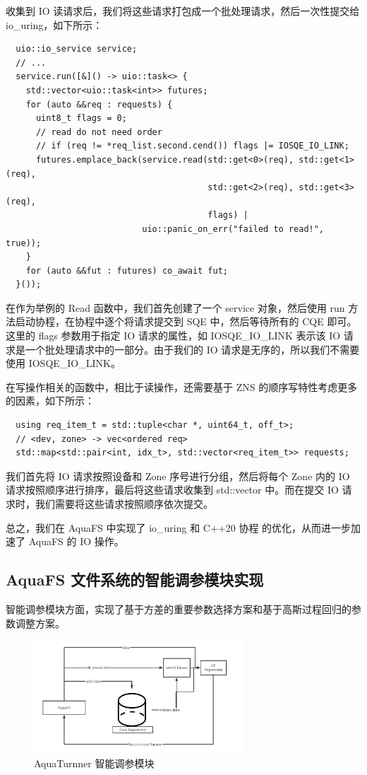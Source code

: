 收集到 IO 读请求后，我们将这些请求打包成一个批处理请求，然后一次性提交给 io\_uring，如下所示：

\begin{lstlisting}
  uio::io_service service;
  // ...
  service.run([&]() -> uio::task<> {
    std::vector<uio::task<int>> futures;
    for (auto &&req : requests) {
      uint8_t flags = 0;
      // read do not need order
      // if (req != *req_list.second.cend()) flags |= IOSQE_IO_LINK;
      futures.emplace_back(service.read(std::get<0>(req), std::get<1>(req),
                                        std::get<2>(req), std::get<3>(req),
                                        flags) |
                           uio::panic_on_err("failed to read!", true));
    }
    for (auto &&fut : futures) co_await fut;
  }());
\end{lstlisting}

在作为举例的 Read 函数中，我们首先创建了一个 service 对象，然后使用 run 方法启动协程，在协程中逐个将请求提交到 SQE 中，然后等待所有的 CQE 即可。这里的 flags 参数用于指定 IO 请求的属性，如 IOSQE\_IO\_LINK 表示该 IO 请求是一个批处理请求中的一部分。由于我们的 IO 请求是无序的，所以我们不需要使用 IOSQE\_IO\_LINK。

在写操作相关的函数中，相比于读操作，还需要基于 ZNS 的顺序写特性考虑更多的因素，如下所示：

\begin{lstlisting}
  using req_item_t = std::tuple<char *, uint64_t, off_t>;
  // <dev, zone> -> vec<ordered req>
  std::map<std::pair<int, idx_t>, std::vector<req_item_t>> requests;
\end{lstlisting}

我们首先将 IO 请求按照设备和 Zone 序号进行分组，然后将每个 Zone 内的 IO 请求按照顺序进行排序，最后将这些请求收集到 std::vector 中。而在提交 IO 请求时，我们需要将这些请求按照顺序依次提交。

总之，我们在 AquaFS 中实现了 io\_uring 和 C++20 协程 的优化，从而进一步加速了 AquaFS 的 IO 操作。

\subsection{AquaFS 文件系统的智能调参模块实现}

智能调参模块方面，实现了基于方差的重要参数选择方案和基于高斯过程回归的参数调整方案。

\begin{figure}[htbp]
  \centering
  \includegraphics[width=0.7\textwidth]{fig/aquaturnner}
  \caption{AquaTurnner 智能调参模块}
  \label{aquaturnner}
\end{figure}

